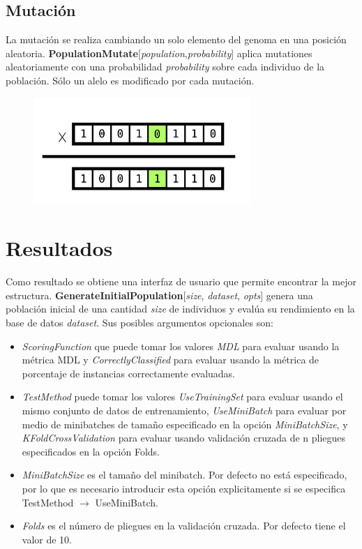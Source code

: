 \documentclass[10pt,a4paper]{article}
\begin{document}
\subsection{Mutación}
La mutación se realiza cambiando un solo elemento del genoma en una posición aleatoria. \textbf{PopulationMutate}[\textit{population},\textit{probability}] aplica mutationes aleatoriamente con una probabilidad \textit{probability} sobre cada individuo de la población. Sólo un alelo es modificado por cada mutación.

\begin{figure}[h!tb!]
\centering
    \includegraphics[scale=0.45]{img/mutation_diagram.png}
\end{figure}

\section{Resultados} \label{sec:results}
Como resultado se obtiene una interfaz de usuario que permite encontrar la mejor estructura. \textbf{GenerateInitialPopulation}[\textit{size}, \textit{dataset}, \textit{opts}] genera una población inicial de una cantidad \textit{size} de individuos y evalúa su rendimiento en la base de datos \textit{dataset}. Sus posibles argumentos opcionales son:
\begin{itemize}
\item \textit{ScoringFunction} que puede tomar los valores \textit{MDL} para evaluar usando la métrica MDL y \textit{CorrectlyClassified} para evaluar usando la métrica de porcentaje de instancias correctamente evaluadas.
\item \textit{TestMethod} puede tomar los valores \textit{UseTrainingSet} para evaluar usando el mismo conjunto de datos de entrenamiento, \textit{UseMiniBatch} para evaluar por medio de minibatches de tamaño especificado en la opción \textit{MiniBatchSize}, y \textit{KFoldCrossValidation} para evaluar usando validación cruzada de n pliegues especificados en la opción Folds.
\item \textit{MiniBatchSize} es el tamaño del minibatch. Por defecto no está especificado, por lo que es necesario introducir esta opción explicitamente si se especifica TestMethod $\rightarrow$ UseMiniBatch.
\item \textit{Folds} es el número de pliegues en la validación cruzada. Por defecto tiene el valor de 10.
\end{itemize}
\end{document}
